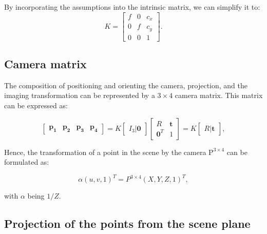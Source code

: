 By incorporating the assumptions  into the intrinsic matrix,
we can simplify it to:
\begin{equation}
	K = \begin{bmatrix}
		f & 0 & c_x \\
		0 & f & c_y \\
		0 & 0 & 1
	\end{bmatrix}.
\end{equation}

\subsection{Camera matrix}\label{sub:camera_matrix}

The composition of positioning and orienting the camera, projection, and the
imaging transformation can be represented by a $3 \times 4$ camera
matrix. This matrix can be expressed as:

\begin{equation}
	\begin{bmatrix}
		\mathbf{p_1} & \mathbf{p_2} & \mathbf{p_3} & \mathbf{p_4}
	\end{bmatrix} = K \begin{bmatrix}
		I_3 \vert \mathbf{0}
	\end{bmatrix} \begin{bmatrix}
		R              & \mathbf{t} \\
		\mathbf{0}^{T} & 1
	\end{bmatrix} = K \begin{bmatrix}
		R \vert \mathbf{t}
	\end{bmatrix},
\end{equation}

Hence, the transformation of a point in the scene by the camera $\mathrm{P}^{3 \times 4}$ can be formulated as:

\begin{equation}
	\alpha(u, v, 1)^{T} = P^{3 \times 4}(X, Y, Z, 1)^{T},
\end{equation}

with $\alpha$ being $1 / Z$.

\subsection{Projection of the points from the scene plane}\label{sub:projection_of_the_points_from_the_scene_plane}

